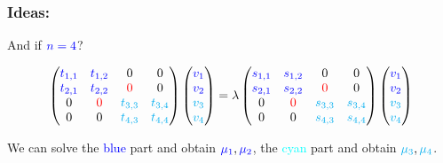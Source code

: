 \documentclass{beamer}
\theoremstyle{definition} \newtheorem{de}{Def}
\theoremstyle{remark} \newtheorem{os}[de]{Remark}
\theoremstyle{plain} \newtheorem{te}[de]{Teo}
\theoremstyle{plain} \newtheorem{co}[de]{Cor}
\theoremstyle{plain} \newtheorem{pr}[de]{Prop}
\theoremstyle{plain} \newtheorem{lem}[de]{Lemm}
\theoremstyle{remark} \newtheorem{rem}[de]{Remark}
\begin{document}
\begin{frame}
  \frametitle{Ideas:}

  And if $\textcolor{blue}{n=4}$?
  

  \begin{equation*}
    \begin{pmatrix}
      \textcolor{blue}{t_{1,1}} & \textcolor{blue}{t_{1,2}} & 0 & 0\\
      \textcolor{blue}{t_{2,1}} & \textcolor{blue}{t_{2,2}} & \textcolor{red}{0} & 0\\
      0 & \textcolor{red}{0} & \textcolor{cyan}{t_{3,3}} & \textcolor{cyan}{t_{3,4}}\\
      0 & 0 & \textcolor{cyan}{t_{4,3}} & \textcolor{cyan}{t_{4,4}}
    \end{pmatrix} \begin{pmatrix} 
      \textcolor{blue}{v_1} \\ 
      \textcolor{blue}{v_2} \\
      \textcolor{cyan}{v_3} \\
      \textcolor{cyan}{v_4}
    \end{pmatrix} = \lambda \begin{pmatrix}
      \textcolor{blue}{s_{1,1}} & \textcolor{blue}{s_{1,2}} & 0 & 0\\
      \textcolor{blue}{s_{2,1}} & \textcolor{blue}{s_{2,2}} & \textcolor{red}{0} & 0\\
      0 & \textcolor{red}{0} & \textcolor{cyan}{s_{3,3}} & \textcolor{cyan}{s_{3,4}}\\
      0 & 0 & \textcolor{cyan}{s_{4,3}} & \textcolor{cyan}{s_{4,4}}
    \end{pmatrix} \begin{pmatrix}
      \textcolor{blue}{v_1} \\ 
      \textcolor{blue}{v_2} \\
      \textcolor{cyan}{v_3} \\
      \textcolor{cyan}{v_4}
    \end{pmatrix}
  \end{equation*}


\pause


We can solve the \textcolor{blue}{blue} part and obtain $\textcolor{blue}{\mu_{1}},\textcolor{blue}{\mu_{2}}$, the \textcolor{cyan}{cyan} part and obtain $\textcolor{cyan}{\mu_{3}},\textcolor{cyan}{\mu_{4}}$.

\end{frame}
\end{document}
